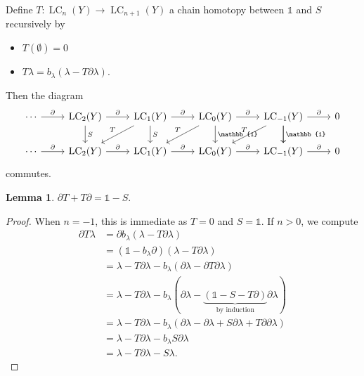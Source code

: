 \documentclass[10pt,letterpaper,cm]{nupset}
\theoremstyle{definition}
\theoremstyle{theorem}
\newtheorem{lemma}[definition]{Lemma}
\theoremstyle{remark}
\newcommand{\1}{\mathbb{1}}
\newcommand{\0}{\vec 0}
\DeclareMathOperator{\lc}{\mathrm{LC}}
\begin{document}
\medskip

Define $T: \lc_n(Y) \to \lc_{n+1}(Y)$ a chain homotopy between $\1$ and $S$ recursively by 
\begin{itemize}
\item $T(\emptyset) =0$
\item $T\lambda  = b_{\lambda}(\lambda  - T\partial{\lambda})$.
\end{itemize}
Then the diagram
\[
\begin{tikzcd}
\cdots \arrow[r, "\partial"] & \lc_2(Y) \arrow[r, "\partial"] \arrow[d, "S"] & \lc_1(Y) \arrow[r, "\partial"] \arrow[d, "S"] \arrow[ld, "T"'] & \lc_0(Y) \arrow[r, "\partial"] \arrow[d, "\1"] \arrow[ld, "T"'] & \lc_{-1}(Y) \arrow[r, "\partial"] \arrow[d, "\1"] \arrow[d] \arrow[ld, "T"'] & 0 \\
\cdots \arrow[r, "\partial"] & \lc_2(Y) \arrow[r, "\partial"]                & \lc_1(Y) \arrow[r, "\partial"]                                 & \lc_0(Y) \arrow[r, "\partial"]                                  & \lc_{-1}(Y) \arrow[r, "\partial"]                                            & 0
\end{tikzcd}
\] commutes.
\begin{lemma}
$\partial{T} + T\partial = \1 - S$.
\end{lemma}
\begin{proof}
When $n= -1$, this is immediate as $T=0$ and $S=\1$. If $n>0$, we compute
\begin{align*}
 \partial{T \lambda} & =  \partial{b_{\lambda}(\lambda  - T\partial{\lambda})}
 \\ & = \left(\1 - b_{\lambda}{\partial}\right)\left(\lambda - T{\partial{\lambda}}\right)
 \\ & = \lambda - T\partial{\lambda}- b_{\lambda}\left(\partial{\lambda} -\partial{T{\partial{\lambda}}}\right)
 \\ & =  \lambda - T\partial{\lambda}- b_{\lambda}(\partial{\lambda} -\underbrace{(\1 -S - T{\partial})}_{\text{by induction}}{\partial{\lambda}})
 \\ & = \lambda - T\partial{\lambda}- b_{\lambda}(\partial{\lambda} - \partial{\lambda} +S{\partial{\lambda}} +T{\partial{\partial}}{\lambda})
 \\ & = \lambda  - T\partial{\lambda}  -b_{\lambda}{S{\partial{\lambda}}}
 \\ & = \lambda  - T\partial{\lambda} -S{\lambda}.
\end{align*}
\end{proof}


\medskip
\end{document}
